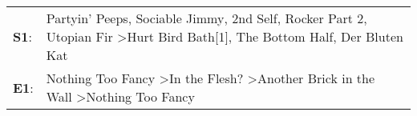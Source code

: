 \begin{supertabular}{p{0.03\textwidth}p{0.92\textwidth}}
 \textbf{S1}:  &  Partyin' Peeps\textsuperscript{}, \enspace Sociable Jimmy\textsuperscript{}, \enspace 2nd Self\textsuperscript{}, \enspace Rocker Part 2\textsuperscript{}, \enspace Utopian Fir\textsuperscript{} \textgreater \enspace Hurt Bird Bath[1]\textsuperscript{}, \enspace The Bottom Half\textsuperscript{}, \enspace Der Bluten Kat\textsuperscript{}  \enspace  \\
 \textbf{E1}:  &                                                                                                                                Nothing Too Fancy\textsuperscript{} \textgreater \enspace In the Flesh?\textsuperscript{} \textgreater \enspace Another Brick in the Wall\textsuperscript{} \textgreater \enspace Nothing Too Fancy\textsuperscript{}  \enspace  \\
\end{supertabular}
